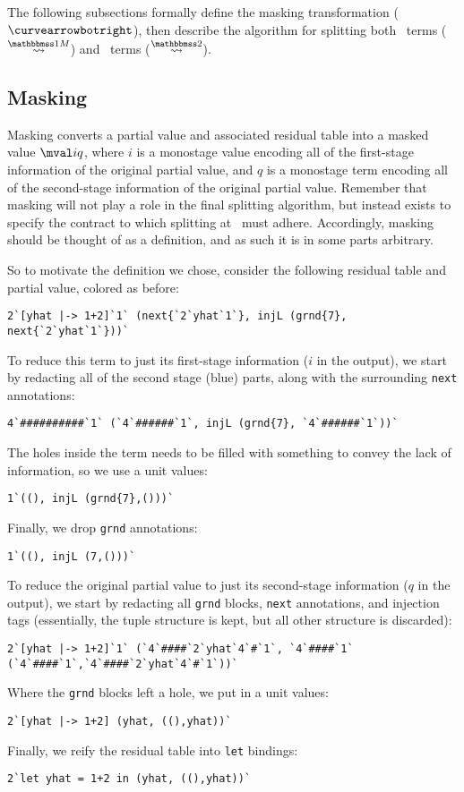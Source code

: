 \begin{abstrsyn}
The following subsections formally define the masking transformation
($\vsplito$), then describe the algorithm for splitting both
\bbonem\ terms ($\splitonesym$) and \bbtwo\ terms ($\splittwosym$).
  
\subsection{Masking}

Masking converts a partial value and associated residual table into a masked value $\mval i q$,
where $i$ is a monostage value encoding all of the first-stage information of the original partial value,
and $q$ is a monostage term encoding all of the second-stage information of the original partial value.
Remember that masking will not play a role in the final splitting algorithm, 
but instead exists to specify the contract to which splitting at \bbonem\ must adhere.
Accordingly, masking should be thought of as a definition, and as such it is in some parts arbitrary.

So to motivate the definition we chose, consider the following residual table and partial value,
colored as before:
\begin{lstlisting}
2`[yhat |-> 1+2]`1` (next{`2`yhat`1`}, injL (grnd{7}, next{`2`yhat`1`}))`
\end{lstlisting}
To reduce this term to just its first-stage information ($i$ in the output), we start by redacting all of the second stage (blue) parts,
along with the surrounding \texttt{next} annotations:
\begin{lstlisting}
4`##########`1` (`4`######`1`, injL (grnd{7}, `4`######`1`))`
\end{lstlisting}
The holes inside the term needs to be filled with something to convey the lack of information, so we use a unit values:
\begin{lstlisting}
1`((), injL (grnd{7},()))`
\end{lstlisting}
Finally, we drop \texttt{grnd} annotations:
\begin{lstlisting}
1`((), injL (7,()))`
\end{lstlisting}
To reduce the original partial value to just its second-stage information ($q$ in the output), 
we start by redacting all \texttt{grnd} blocks, \texttt{next} annotations, and injection tags
(essentially, the tuple structure is kept, but all other structure is discarded):
\begin{lstlisting}
2`[yhat |-> 1+2]`1` (`4`####`2`yhat`4`#`1`, `4`####`1` (`4`####`1`,`4`####`2`yhat`4`#`1`))`
\end{lstlisting}
Where the \texttt{grnd} blocks left a hole, we put in a unit values:
\begin{lstlisting}
2`[yhat |-> 1+2] (yhat, ((),yhat))`
\end{lstlisting}
Finally, we reify the residual table into \texttt{let} bindings:
\begin{lstlisting}
2`let yhat = 1+2 in (yhat, ((),yhat))`
\end{lstlisting}


\end{abstrsyn}

